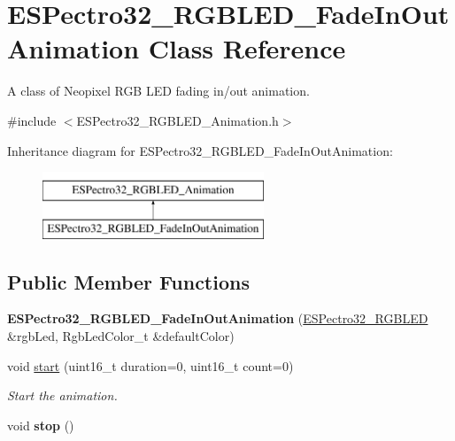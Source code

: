 \hypertarget{classESPectro32__RGBLED__FadeInOutAnimation}{\section{E\-S\-Pectro32\-\_\-\-R\-G\-B\-L\-E\-D\-\_\-\-Fade\-In\-Out\-Animation Class Reference}
\label{classESPectro32__RGBLED__FadeInOutAnimation}
}


A class of Neopixel R\-G\-B L\-E\-D fading in/out animation.  




{\ttfamily \#include $<$E\-S\-Pectro32\-\_\-\-R\-G\-B\-L\-E\-D\-\_\-\-Animation.\-h$>$}

Inheritance diagram for E\-S\-Pectro32\-\_\-\-R\-G\-B\-L\-E\-D\-\_\-\-Fade\-In\-Out\-Animation\-:\begin{figure}[H]
\begin{center}
\leavevmode
\includegraphics[height=2.000000cm]{classESPectro32__RGBLED__FadeInOutAnimation}
\end{center}
\end{figure}
\subsection*{Public Member Functions}
\begin{DoxyCompactItemize}
\item 
\hypertarget{classESPectro32__RGBLED__FadeInOutAnimation_aa60ab4ac0e9f8af2bba902f241b7893e}{{\bfseries E\-S\-Pectro32\-\_\-\-R\-G\-B\-L\-E\-D\-\_\-\-Fade\-In\-Out\-Animation} (\hyperlink{classESPectro32__RGBLED}{E\-S\-Pectro32\-\_\-\-R\-G\-B\-L\-E\-D} \&rgb\-Led, Rgb\-Led\-Color\-\_\-t \&default\-Color)}\label{classESPectro32__RGBLED__FadeInOutAnimation_aa60ab4ac0e9f8af2bba902f241b7893e}

\item 
void \hyperlink{classESPectro32__RGBLED__FadeInOutAnimation_a866667413ae40d902991884948a21215}{start} (uint16\-\_\-t duration=0, uint16\-\_\-t count=0)
\begin{DoxyCompactList}\small\item\em Start the animation. \end{DoxyCompactList}\item 
\hypertarget{classESPectro32__RGBLED__FadeInOutAnimation_a31c16b54569f6c2cac3586fcbb052c1d}{void {\bfseries stop} ()}\label{classESPectro32__RGBLED__FadeInOutAnimation_a31c16b54569f6c2cac3586fcbb052c1d}

\end{DoxyCompactItemize}

